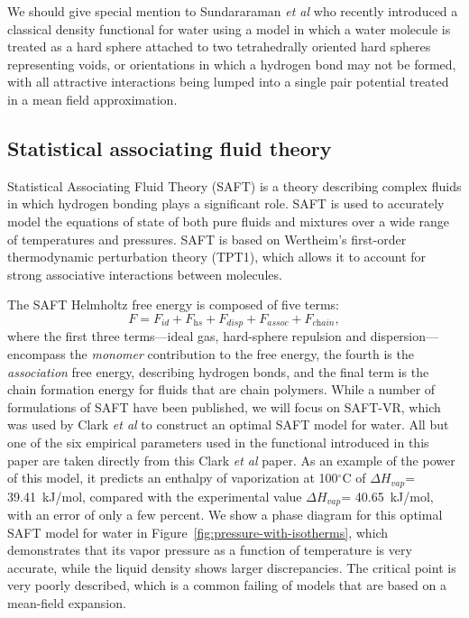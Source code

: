 \documentclass[twocolumn,amsmath,amssymb,prl]{revtex4-1}
\begin{document}
We should give special mention to Sundararaman \emph{et al} who
recently introduced a classical density functional for water using a
model in which a water molecule is treated as a hard sphere attached to
two tetrahedrally oriented hard spheres representing voids, or
orientations in which a hydrogen bond may not be formed, with all
attractive interactions being lumped into a single pair potential
treated in a mean field
approximation\cite{sundararaman2012computationally}.

\subsection{Statistical associating fluid theory}

Statistical Associating Fluid Theory (SAFT) is a theory describing
complex fluids in which hydrogen bonding plays a significant
role\cite{chapman1989saft, muller2001molecular}.  SAFT is used to
accurately model the equations of state of both pure fluids and
mixtures over a wide range of temperatures and pressures.  SAFT is
based on Wertheim's first-order thermodynamic perturbation theory
(TPT1)\cite{wertheim1984fluidsI, wertheim1984fluidsII,
  wertheim1986fluidsIII, wertheim1986fluidsIV}, which allows it to
account for strong associative interactions between molecules.

The SAFT Helmholtz free energy is composed of five terms:
\begin{equation} \label{eq:SAFT-free-energy}
  F = F_\textit{id} + F_\textit{hs} + F_\textit{disp} +
  F_\textit{assoc} + F_\textit{chain},
\end{equation}
where the first three terms---ideal gas, hard-sphere repulsion and
dispersion---encompass the \emph{monomer} contribution
to the free energy, the fourth is the \emph{association} free energy,
describing hydrogen bonds, and the final term is the chain formation
energy for fluids that are chain polymers.  While a
number of formulations of SAFT have been published, we will focus on
SAFT-VR\cite{gil-villegas-1997-SAFT-VR}, which was used by Clark
\emph{et al} to construct an optimal SAFT model for
water\cite{clark2006developing}. All but one of the six empirical
parameters used in the functional introduced in this paper are taken
directly from this Clark \emph{et al} paper.  As an example of the
power of this model, it predicts an enthalpy of vaporization at
100$^\circ$C of $\Delta H_{vap}$= 39.41~kJ/mol, compared with the
experimental value $\Delta H_{vap}$= 40.65~kJ/mol\cite{nistwater},
with an error of only a few percent.  We show a phase diagram for
this optimal SAFT model for water in
Figure~\ref{fig:pressure-with-isotherms}, which demonstrates that its
vapor pressure as a function of temperature is very accurate, while
the liquid density shows larger discrepancies.  The critical point is
very poorly described, which is a common failing of models that are
based on a mean-field expansion.
\end{document}
